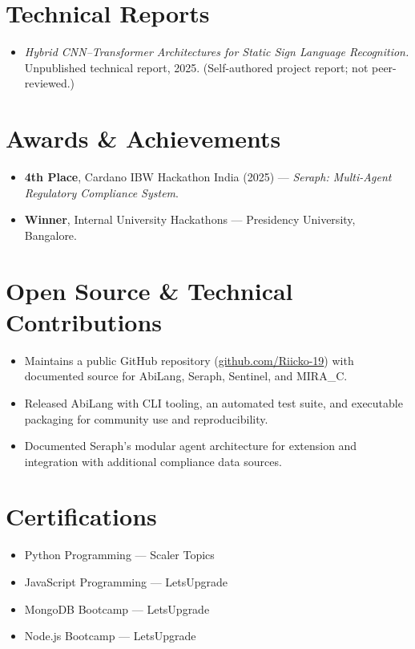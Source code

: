 \documentclass[11pt,letterpaper]{article}
\begin{document}
\section{Technical Reports}
\begin{itemize}
  \item \textit{Hybrid CNN--Transformer Architectures for Static Sign Language
        Recognition.} Unpublished technical report, 2025. (Self-authored project
        report; not peer-reviewed.)
\end{itemize}

\section{Awards \& Achievements}
\begin{itemize}
  \item \textbf{4th Place}, Cardano IBW Hackathon India (2025) --- \textit{Seraph:
        Multi-Agent Regulatory Compliance System}.
  \item \textbf{Winner}, Internal University Hackathons --- Presidency University,
        Bangalore.
\end{itemize}

\section{Open Source \& Technical Contributions}
\begin{itemize}
  \item Maintains a public GitHub repository
        (\href{https://github.com/Riicko-19}{github.com/Riicko-19}) with documented
        source for AbiLang, Seraph, Sentinel, and MIRA\_C.
  \item Released AbiLang with CLI tooling, an automated test suite, and executable
        packaging for community use and reproducibility.
  \item Documented Seraph's modular agent architecture for extension and
        integration with additional compliance data sources.
\end{itemize}

\section{Certifications}
\begin{itemize}
  \item Python Programming --- Scaler Topics
  \item JavaScript Programming --- LetsUpgrade
  \item MongoDB Bootcamp --- LetsUpgrade
  \item Node.js Bootcamp --- LetsUpgrade
\end{itemize}
\end{document}
